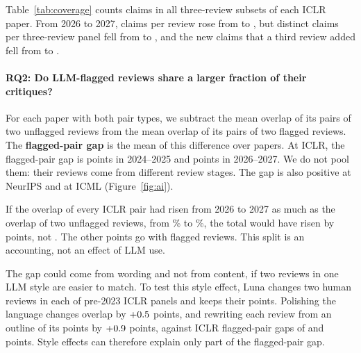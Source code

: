 \documentclass[11pt]{article}
\begin{document}
Table~\ref{tab:coverage} counts claims in all three-review subsets of each ICLR paper. From 2026 to 2027, claims per review rose from \CovPerReviewLast{} to \CovPerReviewSnap, but distinct claims per three-review panel fell from \CovProblemsLast{} to \CovProblemsSnap, and the new claims that a third review added fell from \CovNewLast{} to \CovNewSnap.

\begin{table}[t]
\centering\footnotesize
\setlength{\tabcolsep}{0pt}

\caption{ICLR three-review panels hold fewer distinct claims in 2027 than in any year from 2020, although claims per review did not fall from 2026. Distinct: claims of the three reviews, with a repeated claim counted once. $^\dagger$Reviews during the discussion phase; earlier years hold final reviews.}
\label{tab:coverage}
\end{table}

\paragraph{RQ2: Do LLM-flagged reviews share a larger fraction of their critiques?}
\label{sec:ai}
For each paper with both pair types, we subtract the mean overlap of its pairs of two unflagged reviews from the mean overlap of its pairs of two flagged reviews. The \textbf{flagged-pair gap} is the mean of this difference over papers. At ICLR, the flagged-pair gap is \FlagGapEarly{} points in 2024--2025 and \FlagGapLate{} points in 2026--2027. We do not pool them: their reviews come from different review stages. The gap is also positive at NeurIPS and at ICML (Figure~\ref{fig:ai}).

If the overlap of every ICLR pair had risen from 2026 to 2027 as much as the overlap of two unflagged reviews, from \DecIclrNoneLast\% to \DecSnapNoneLast\%, the total would have risen by \DecSnapBackground{} points, not \DecSnapChange. The other \DecSnapLlm{} points go with flagged reviews. This split is an accounting, not an effect of LLM use.

The gap could come from wording and not from content, if two reviews in one LLM style are easier to match. To test this style effect, Luna changes two human reviews in each of \RwIclrPapers{} pre-2023 ICLR panels and keeps their points. Polishing the language changes overlap by $+0.5$ points, and rewriting each review from an outline of its points by $+0.9$ points, against ICLR flagged-pair gaps of \FlagGapEarly{} and \FlagGapLate{} points. Style effects can therefore explain only part of the flagged-pair gap.
\end{document}
